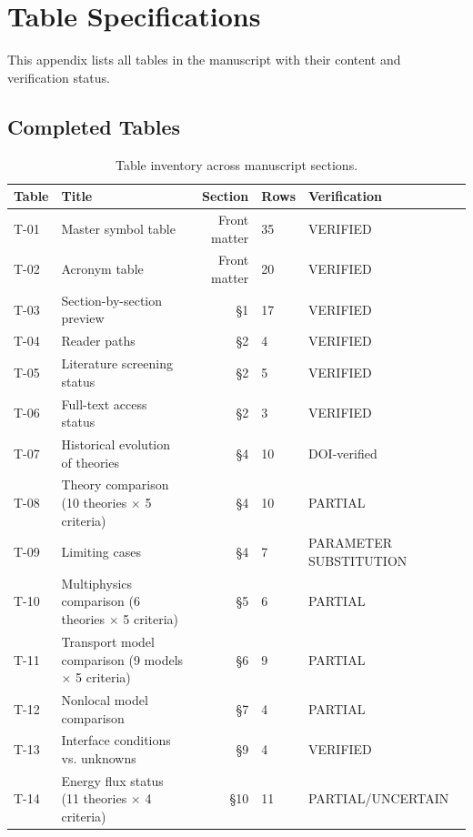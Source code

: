 \section{Table Specifications}
\label{app:tables}

This appendix lists all tables in the manuscript with their content and verification status.

\subsection{Completed Tables}

\begin{table}[h]
\centering
\small
\caption{Table inventory across manuscript sections.}
\label{tab:appE-tables}
\begin{tabularx}{\textwidth}{@{}lXrlX@{}}
\toprule
\textbf{Table} & \textbf{Title} & \textbf{Section} & \textbf{Rows} & \textbf{Verification} \\
\midrule
T-01 & Master symbol table & Front matter & 35 & VERIFIED \\
T-02 & Acronym table & Front matter & 20 & VERIFIED \\
T-03 & Section-by-section preview & §1 & 17 & VERIFIED \\
T-04 & Reader paths & §2 & 4 & VERIFIED \\
T-05 & Literature screening status & §2 & 5 & VERIFIED \\
T-06 & Full-text access status & §2 & 3 & VERIFIED \\
T-07 & Historical evolution of theories & §4 & 10 & DOI-verified \\
T-08 & Theory comparison (10 theories $\times$ 5 criteria) & §4 & 10 & PARTIAL \\
T-09 & Limiting cases & §4 & 7 & PARAMETER SUBSTITUTION \\
T-10 & Multiphysics comparison (6 theories $\times$ 5 criteria) & §5 & 6 & PARTIAL \\
T-11 & Transport model comparison (9 models $\times$ 5 criteria) & §6 & 9 & PARTIAL \\
T-12 & Nonlocal model comparison & §7 & 4 & PARTIAL \\
T-13 & Interface conditions vs. unknowns & §9 & 4 & VERIFIED \\
T-14 & Energy flux status (11 theories $\times$ 4 criteria) & §10 & 11 & PARTIAL/UNCERTAIN \\

\end{tabularx}
\end{table}
